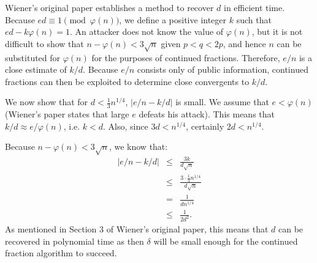 \documentclass[a4paper]{article}
\begin{document}
Wiener's original paper establishes a method to recover $d$ in efficient time. Because $ed \equiv 1 \pmod{\varphi(n)}$, we define a positive integer $k$ such that $ed - k\varphi(n) = 1$. An attacker does not know the value of $\varphi(n)$, but it is not difficult to show that $n - \varphi(n) < 3\sqrt{n}$ given $p < q < 2p$, and hence $n$ can be substituted for $\varphi(n)$ for the purposes of continued fractions. Therefore, $e/n$ is a close estimate of $k/d$. Because $e/n$ consists only of public information, continued fractions can then be exploited to determine close convergents to $k/d$.

We now show that for $d < \frac13 n^{1/4}$, $|e/n - k/d|$ is small. We assume that $e < \varphi(n)$ (Wiener's paper states that large $e$ defeats his attack). This means that $k/d \approx e/\varphi(n)$, i.e. $k < d$. Also, since $3d < n^{1/4}$, certainly $2d < n^{1/4}$.

Because $n - \varphi(n) < 3\sqrt{n}$, we know that: \begin{eqnarray*} |e/n - k/d| &\leq& \frac{3k}{d\sqrt n} \\ &\leq& \frac{3 \cdot \frac13 n^{1/4}}{d\sqrt n} \\ &=& \frac1{d n^{1/4}} \\ &\leq& \frac 1{2d^2}. \end{eqnarray*} As mentioned in Section 3 of Wiener's original paper, this means that $d$ can be recovered in polynomial time as then $\delta$ will be small enough for the continued fraction algorithm to succeed.
\end{document}
